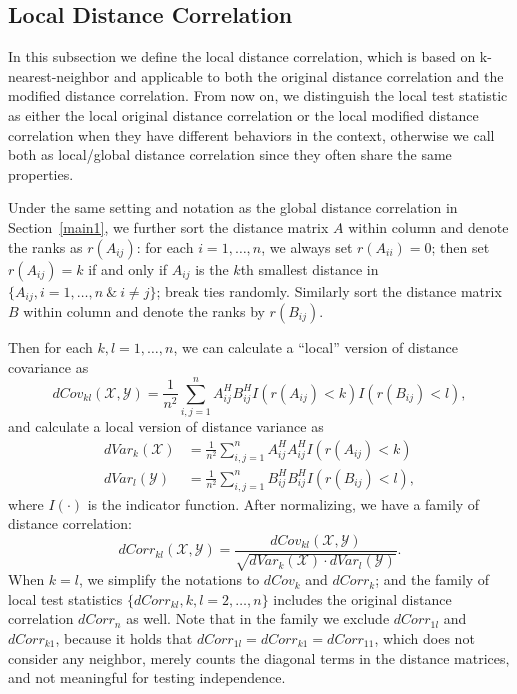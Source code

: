 \documentclass[12pt]{article}
\begin{document}
\subsection{Local Distance Correlation}
\label{main2}
In this subsection we define the local distance correlation, which is based on k-nearest-neighbor and applicable to both the original distance correlation and the modified distance correlation. From now on, we distinguish the local test statistic as either the local original distance correlation or the local modified distance correlation when they have different behaviors in the context, otherwise we call both as local/global distance correlation since they often share the same properties.

Under the same setting and notation as the global distance correlation in Section~\ref{main1}, we further sort the distance matrix $A$ within column and denote the ranks as $r(A_{ij})$: for each $i=1, \ldots, n$, we always set $r(A_{ii})=0$; then set $r(A_{ij})=k$ if and only if $A_{ij}$ is the $k$th smallest distance in $\{A_{ij}, i=1,\ldots,n\ \& \ i \neq j\}$; break ties randomly. Similarly sort the distance matrix $B$ within column and denote the ranks by $r(B_{ij})$.

Then for each $k,l=1,\ldots,n$, we can calculate a ``local'' version of distance covariance as
\begin{equation}
\label{localdCovEqu}
dCov_{kl}(\mathcal{X},\mathcal{Y})=\frac{1}{n^2}\sum_{i,j=1}^{n}A^{H}_{ij}B^{H}_{ij}I(r(A_{ij})<k)I(r(B_{ij})<l),
\end{equation}
and calculate a local version of distance variance as
\begin{align*}
dVar_{k}(\mathcal{X}) &=\frac{1}{n^2}\sum_{i,j=1}^{n}A^{H}_{ij}A^{H}_{ij}I(r(A_{ij})<k)\\
dVar_{l}(\mathcal{Y}) &=\frac{1}{n^2}\sum_{i,j=1}^{n}B^{H}_{ij}B^{H}_{ij}I(r(B_{ij})<l),
\end{align*}
where $I(\cdot)$ is the indicator function. After normalizing, we have a family of distance correlation:
\begin{equation}
\label{localdCorrEqu}
dCorr_{kl}(\mathcal{X},\mathcal{Y})=\frac{dCov_{kl}(\mathcal{X},\mathcal{Y})}{\sqrt{dVar_{k}(\mathcal{X}) \cdot dVar_{l}(\mathcal{Y})}}.
\end{equation}
When $k=l$, we simplify the notations to $dCov_{k}$ and $dCorr_{k}$; and the family of local test statistics $\{dCorr_{kl}, k,l=2,\ldots,n\}$ includes the original distance correlation $dCorr_{n}$ as well. Note that in the family we exclude $dCorr_{1l}$ and $dCorr_{k1}$, because it holds that $dCorr_{1l}=dCorr_{k1}=dCorr_{11}$, which does not consider any neighbor, merely counts the diagonal terms in the distance matrices, and not meaningful for testing independence.
\end{document}
